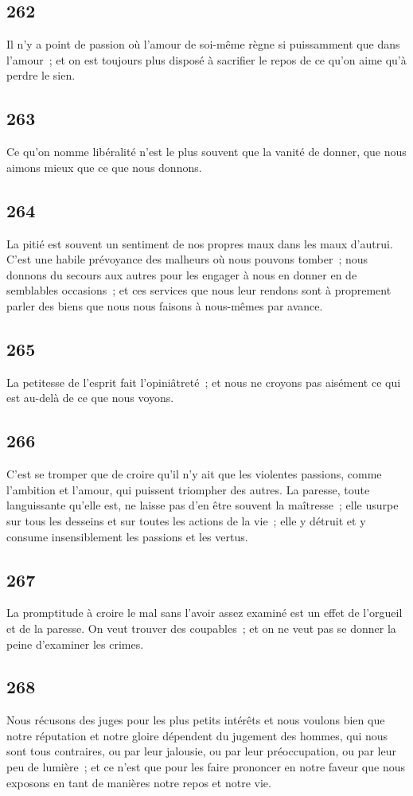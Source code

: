 \documentclass[french,twoside]{book} %
\begin{document}
\subsection[{262}]{ \textsc{262} }
\noindent Il n’y a point de passion où l’amour de soi-même règne si puissamment que dans l’amour ; et on est toujours plus disposé à sacrifier le repos de ce qu’on aime qu’à perdre le sien.
\subsection[{263}]{ \textsc{263} }
\noindent Ce qu’on nomme libéralité n’est le plus souvent que la vanité de donner, que nous aimons mieux que ce que nous donnons.
\subsection[{264}]{ \textsc{264} }
\noindent La pitié est souvent un sentiment de nos propres maux dans les maux d’autrui. C’est une habile prévoyance des malheurs où nous pouvons tomber ; nous donnons du secours aux autres pour les engager à nous en donner en de semblables occasions ; et ces services que nous leur rendons sont à proprement parler des biens que nous nous faisons à nous-mêmes par avance.
\subsection[{265}]{ \textsc{265} }
\noindent La petitesse de l’esprit fait l’opiniâtreté ; et nous ne croyons pas aisément ce qui est au-delà de ce que nous voyons.
\subsection[{266}]{ \textsc{266} }
\noindent C’est se tromper que de croire qu’il n’y ait que les violentes passions, comme l’ambition et l’amour, qui puissent triompher des autres. La paresse, toute languissante qu’elle est, ne laisse pas d’en être souvent la maîtresse ; elle usurpe sur tous les desseins et sur toutes les actions de la vie ; elle y détruit et y consume insensiblement les passions et les vertus.
\subsection[{267}]{ \textsc{267} }
\noindent La promptitude à croire le mal sans l’avoir assez examiné est un effet de l’orgueil et de la paresse. On veut trouver des coupables ; et on ne veut pas se donner la peine d’examiner les crimes.
\subsection[{268}]{ \textsc{268} }
\noindent Nous récusons des juges pour les plus petits intérêts et nous voulons bien que notre réputation et notre gloire dépendent du jugement des hommes, qui nous sont tous contraires, ou par leur jalousie, ou par leur préoccupation, ou par leur peu de lumière ; et ce n’est que pour les faire prononcer en notre faveur que nous exposons en tant de manières notre repos et notre vie.
\end{document}

